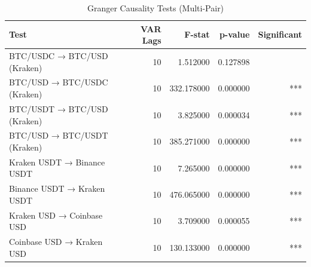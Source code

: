\begin{table}[H]
\caption{Granger Causality Tests (Multi-Pair)}
\label{tab:granger}
\begin{tabular}{lrrrr}
\toprule
Test & VAR Lags & F-stat & p-value & Significant \\
\midrule
BTC/USDC → BTC/USD (Kraken) & 10 & 1.512000 & 0.127898 &  \\
BTC/USD → BTC/USDC (Kraken) & 10 & 332.178000 & 0.000000 & *** \\
BTC/USDT → BTC/USD (Kraken) & 10 & 3.825000 & 0.000034 & *** \\
BTC/USD → BTC/USDT (Kraken) & 10 & 385.271000 & 0.000000 & *** \\
Kraken USDT → Binance USDT & 10 & 7.265000 & 0.000000 & *** \\
Binance USDT → Kraken USDT & 10 & 476.065000 & 0.000000 & *** \\
Kraken USD → Coinbase USD & 10 & 3.709000 & 0.000055 & *** \\
Coinbase USD → Kraken USD & 10 & 130.133000 & 0.000000 & *** \\
\bottomrule
\end{tabular}
\end{table}
